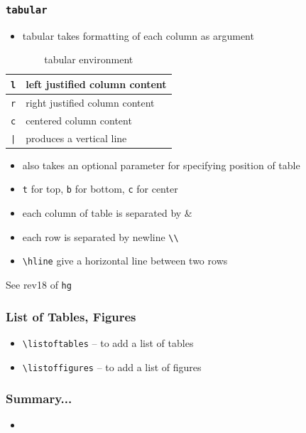 \documentclass{beamer}
\newcommand{\typ}[1]{\lstinline{#1}}
\begin{document}
\begin{frame}[fragile]
  \frametitle{\lstinline+tabular+}
  \begin{itemize}
  \item tabular takes formatting of each column as argument
  \end{itemize}

  \begin{table}
    \caption{tabular environment}
    
    \begin{tabular}{|l|l|}
      \lstinline+l+ & left justified column content\\\hline
      \lstinline+r+ & right justified column content\\\hline
      \lstinline+c+ & centered column content\\\hline
      \lstinline+|+ & produces a vertical line\\
    \end{tabular}
  \end{table}
  \begin{itemize}
  \item also takes an optional parameter for specifying position of
    table 
  \item \lstinline+t+ for top, \lstinline+b+ for bottom, \lstinline+c+
    for center 
  \item each column of table is separated by \&
  \item each row is separated by newline \lstinline{\\}
  \item \lstinline+\hline+ give a horizontal line between two rows
  \end{itemize}
  \tiny See rev18 of \typ{hg}
\end{frame}

\begin{frame}[fragile]
  \frametitle{List of Tables, Figures}
  \begin{itemize}
  \item \lstinline+\listoftables+ -- to add a list of tables
  \item \lstinline+\listoffigures+ -- to add a list of figures
  \end{itemize}
\end{frame}

\begin{frame}[fragile]
	\frametitle{Summary...}
	\begin{itemize}
	\item 
	\end{itemize}
\end{frame}
\end{document}
